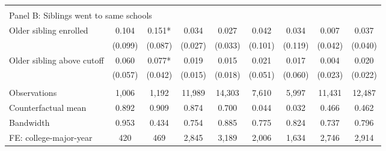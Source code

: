 {{\begin{tabular}{lcccccccc}
&  &  &  & & & & & &    \\
\multicolumn{9}{l}{Panel B: Siblings went to same schools} \\
Older sibling enrolled&       0.104   &       0.151*  &       0.034   &       0.027   &       0.042   &       0.034   &       0.007   &       0.037   \\
                    &     (0.099)   &     (0.087)   &     (0.027)   &     (0.033)   &     (0.101)   &     (0.119)   &     (0.042)   &     (0.040)   \\
 
Older sibling above cutoff&       0.060   &       0.077*  &       0.019   &       0.015   &       0.021   &       0.017   &       0.004   &       0.020   \\
                    &     (0.057)   &     (0.042)   &     (0.015)   &     (0.018)   &     (0.051)   &     (0.060)   &     (0.023)   &     (0.022)   \\
                    &               &               &               &               &               &               &               &               \\
Observations        &       1,006   &       1,192   &      11,989   &      14,303   &       7,610   &       5,997   &      11,431   &      12,487   \\
Counterfactual mean &       0.892   &       0.909   &       0.874   &       0.700   &       0.044   &       0.032   &       0.466   &       0.462   \\
Bandwidth           &       0.953   &       0.434   &       0.754   &       0.885   &       0.775   &       0.824   &       0.737   &       0.796   \\
FE: college-major-year&         420   &         469   &       2,845   &       3,189   &       2,006   &       1,634   &       2,746   &       2,914   \\
 

\bottomrule
\end{tabular}
}
}
